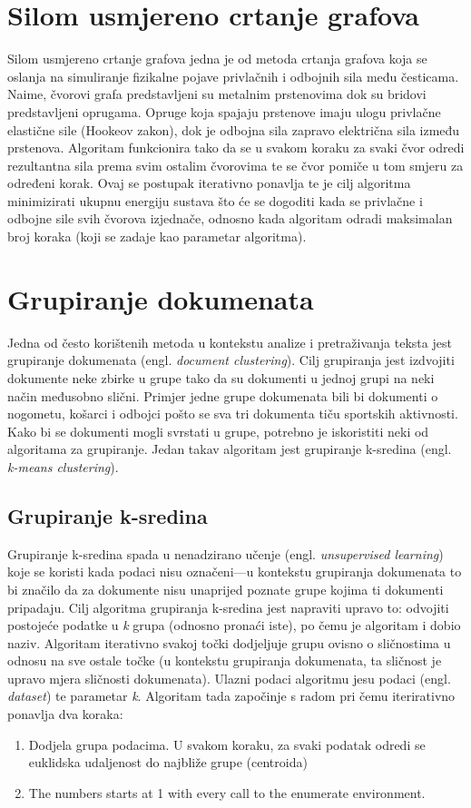 \documentclass[times, utf8, zavrsni]{fer}
\begin{document}
\section{Silom usmjereno crtanje grafova}
\label{subchap:forcedir}
Silom usmjereno crtanje grafova jedna je od metoda crtanja grafova koja se oslanja na simuliranje fizikalne pojave privlačnih i odbojnih sila među česticama. Naime, čvorovi grafa predstavljeni su metalnim prstenovima dok su bridovi predstavljeni oprugama. Opruge koja spajaju prstenove imaju ulogu privlačne elastične sile (Hookeov zakon), dok je odbojna sila zapravo električna sila između prstenova. Algoritam funkcionira tako da se u svakom koraku za svaki čvor odredi rezultantna sila prema svim ostalim čvorovima te se čvor pomiče u tom smjeru za određeni korak. Ovaj se postupak iterativno ponavlja te je cilj algoritma minimizirati ukupnu energiju sustava što će se dogoditi kada se privlačne i odbojne sile svih čvorova izjednače, odnosno kada algoritam odradi maksimalan broj koraka (koji se zadaje kao parametar algoritma).

\section{Grupiranje dokumenata}
Jedna od često korištenih metoda u kontekstu analize i pretraživanja teksta jest grupiranje dokumenata (engl. \textit{document clustering}). Cilj grupiranja jest izdvojiti dokumente neke zbirke u grupe tako da su dokumenti u jednoj grupi na neki način međusobno slični. Primjer jedne grupe dokumenata bili bi dokumenti o nogometu, košarci i odbojci pošto se sva tri dokumenta tiču sportskih aktivnosti. Kako bi se dokumenti mogli svrstati u grupe, potrebno je iskoristiti neki od algoritama za grupiranje. Jedan takav algoritam jest grupiranje k-sredina (engl. \textit{k-means clustering}).

\subsection{Grupiranje k-sredina}
\label{k_means_clustering}
Grupiranje k-sredina spada u nenadzirano učenje (engl. \textit{unsupervised learning}) koje se koristi kada podaci nisu označeni—u kontekstu grupiranja dokumenata to bi značilo da za dokumente nisu unaprijed poznate grupe kojima ti dokumenti pripadaju. Cilj algoritma grupiranja k-sredina jest napraviti upravo to: odvojiti postojeće podatke u \textit{k} grupa (odnosno pronaći iste), po čemu je algoritam i dobio naziv. Algoritam iterativno svakoj točki dodjeljuje grupu ovisno o sličnostima u odnosu na sve ostale točke (u kontekstu grupiranja dokumenata, ta sličnost je upravo mjera sličnosti dokumenata).
Ulazni podaci algoritmu jesu podaci (engl. \textit{dataset}) te parametar \textit{k}. Algoritam tada započinje s radom pri čemu iterirativno ponavlja dva koraka:
\begin{enumerate}
\item Dodjela grupa podacima. U svakom koraku, za svaki podatak odredi se euklidska udaljenost do najbliže grupe (centroida)
\item The numbers starts at 1 with every call to the enumerate environment.
\end{enumerate}
\end{document}
